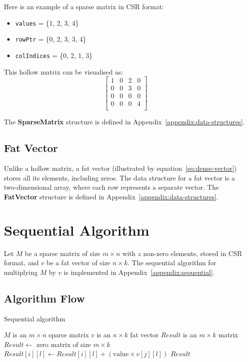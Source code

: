 \documentclass[12pt,oneside]{book} %
\begin{document}
Here is an example of a sparse matrix in CSR format:
\begin{itemize}
    \item \texttt{values} = \{1, 2, 3, 4\}
    \item \texttt{rowPtr} = \{0, 2, 3, 3, 4\}
    \item \texttt{colIndices} = \{0, 2, 1, 3\}
\end{itemize}

This hollow matrix can be visualised as:
\[
    \begin{bmatrix}
        1 & 0 & 2 & 0 \\
        0 & 0 & 3 & 0 \\
        0 & 0 & 0 & 0 \\
        0 & 0 & 0 & 4 \\
    \end{bmatrix}
\]

The \textbf{SparseMatrix} structure is defined in
Appendix~\ref{appendix:data-structures}.

\subsection{Fat Vector}
Unlike a hollow matrix, a fat vector (illustrated by
equation~\ref{eq:dense-vector}) stores all its elements, including zeros. The
data structure for a fat vector is a two-dimensional array, where each row
represents a separate vector. The \textbf{FatVector} structure is defined in
Appendix~\ref{appendix:data-structures}.

\section{Sequential Algorithm}
Let \( M \) be a sparse matrix of size \( m \times n \) with \( z \) non-zero
elements, stored in CSR format, and \( v \) be a fat vector of size \( n \times
k \). The sequential algorithm for multiplying \( M \) by \( v \) is
implemented in Appendix~\ref{appendix:sequential}.

\subsection{Algorithm Flow}

\begin{algorithm}[H]
    \caption{Sequential algorithm}
    \begin{algorithmic}
        \Require $M$ is an $m \times n$ sparse matrix
        \Require $v$ is an $n \times k$ fat vector
        \Ensure  $Result$ is an $m \times k$ matrix
        \State $Result \gets$ zero matrix of size $m \times k$
        \State $Result[i][l] \gets Result[i][l] + (\text{value} \times v[j][l])$
        \EndFor
        \EndFor
        \EndFor
        \State \Return $Result$
    \end{algorithmic}
\end{algorithm}
\end{document}
